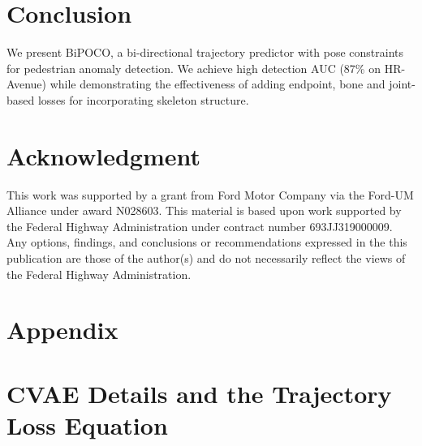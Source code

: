 \documentclass[nohyperref]{article}
\theoremstyle{plain}
\theoremstyle{definition}
\theoremstyle{remark}
\begin{document}
\section{Conclusion}
\vspace{-2mm}
We present BiPOCO, a bi-directional trajectory predictor with pose constraints for pedestrian anomaly detection.  We achieve high  detection AUC (87\% on HR-Avenue) while demonstrating the effectiveness of adding endpoint, bone and joint-based losses for incorporating skeleton structure.















\clearpage






\section*{Acknowledgment}
This work was supported by a grant from Ford Motor Company via the Ford-UM Alliance under award N028603. This material is based upon work supported by the Federal Highway Administration under contract number 693JJ319000009. Any options, findings, and conclusions or recommendations expressed in the this publication are those of the author(s) and do not necessarily reflect the views of the Federal Highway Administration.




\newpage
\appendix
\onecolumn







\section*{Appendix}

\section{CVAE Details and the  Trajectory Loss Equation} 
\label{appendix:cvae}
\end{document}
